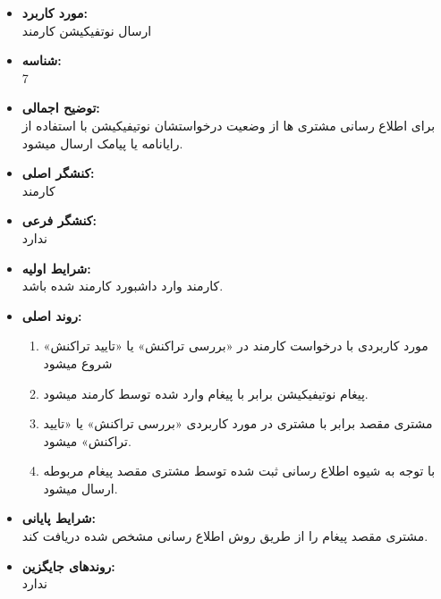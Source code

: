 \documentclass{article}
\begin{document}
\begin{itemize}
\item \textbf{مورد کاربرد:}\\
ارسال نوتفیکیشن کارمند
\item \textbf{شناسه:}\\
7
\item \textbf{توضیح اجمالی:}\\
برای اطلاع رسانی مشتری ها از وضعیت درخواستشان نوتیفیکیشن با استفاده از رایانامه یا پیامک ارسال میشود.
\item \textbf{کنشگر اصلی:}\\
کارمند
\item \textbf{کنشگر فرعی:}\\
ندارد
\item \textbf{شرایط اولیه:}\\
کارمند وارد داشبورد کارمند شده باشد.
\item \textbf{روند اصلی:}\\
\begin{enumerate}
\item مورد کاربردی با درخواست کارمند در «بررسی تراکنش» یا «تایید تراکنش» شروع میشود
\item پیغام نوتیفیکیشن برابر با پیغام وارد شده توسط کارمند میشود.
\item مشتری مقصد برابر با مشتری در مورد کاربردی «بررسی تراکنش» یا «تایید تراکنش» میشود.
\item با توجه به شیوه اطلاع رسانی ثبت شده توسط مشتری مقصد پیغام مربوطه ارسال میشود.
\end{enumerate}

\item \textbf{شرایط پایانی:}\\ 
مشتری مقصد پیغام را از طریق روش اطلاع رسانی مشخص شده دریافت کند.
\item \textbf{روندهای جایگزین:}\\
ندارد
\end{itemize}
\noindent\makebox[\linewidth]{\rule{\paperwidth}{0.4pt}}
\end{document}
